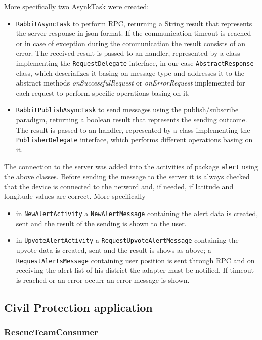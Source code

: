 \documentclass[a4paper,12pt]{report}
\begin{document}
More specifically two AsynkTask were created:
\begin{itemize}
 \item \texttt{RabbitAsyncTask} to perform RPC, returning a String result that represents the server response in json format. If the communication timeout is reached or in case of exception during the communication the result consists of an error. The received result is passed to an handler, represented by a class implementing the \texttt{RequestDelegate} interface, in our case \texttt{AbstractResponse} class, which deserializes it basing on message type and addresses it to the abstract methods \textit{onSuccessfulRequest} or \textit{onErrorRequest} implemented for each request to perform specific operations basing on it.
 \item \texttt{RabbitPublishAsyncTask} to send messages using the publish/subscribe paradigm, returning a boolean result that represents the sending outcome. The result is passed to an handler, represented by a class implementing the \texttt{PublisherDelegate} interface, which performs different operations basing on it.
\end{itemize}
The connection to the server was added into the activities of package \texttt{alert} using the above classes. Before sending the message to the server it is always checked that the device is connected to the netword and, if needed, if latitude and longitude values are correct. More specifically
\begin{itemize}
 \item in \texttt{NewAlertActivity} a \texttt{NewAlertMessage} containing the alert data is created, sent and the result of the sending is shown to the user.
 \item in \texttt{UpvoteAlertActivity} a \texttt{RequestUpvoteAlertMessage} containing the upvote data is created, sent and the result is shows as above; a \texttt{RequestAlertsMessage} containing user position is sent through RPC and on receiving the alert list of his district the adapter must be notified. If timeout is reached or an error occurr an error message is shown.
 
\end{itemize}

\subsection{Civil Protection application}

\subsubsection{RescueTeamConsumer}
\end{document}

